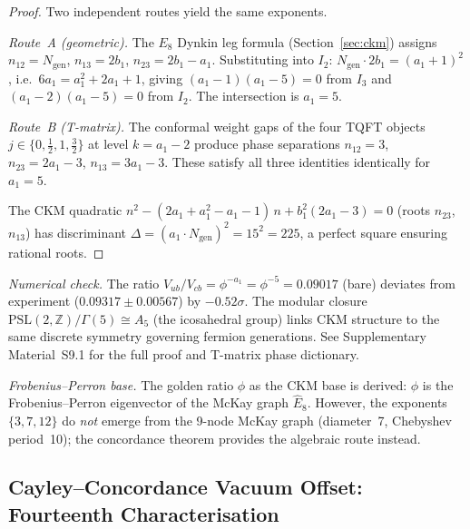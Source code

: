 \documentclass[12pt,a4paper]{article}
\theoremstyle{definition}
\begin{document}
\begin{proof}
Two independent routes yield the same exponents.

\emph{Route~A (geometric).}  The $E_8$ Dynkin leg formula (Section~\ref{sec:ckm}) assigns $n_{12} = N_{\text{gen}}$, $n_{13} = 2b_1$, $n_{23} = 2b_1 - a_1$.  Substituting into $I_2$: $N_{\text{gen}} \cdot 2b_1 = (a_1+1)^2$, i.e.\ $6a_1 = a_1^2 + 2a_1 + 1$, giving $(a_1 - 1)(a_1 - 5) = 0$ from $I_3$ and $(a_1 - 2)(a_1 - 5) = 0$ from $I_2$.  The intersection is $a_1 = 5$.

\emph{Route~B (T-matrix).}  The conformal weight gaps of the four TQFT objects $j \in \{0, \tfrac{1}{2}, 1, \tfrac{3}{2}\}$ at level $k = a_1 - 2$ produce phase separations $n_{12} = 3$, $n_{23} = 2a_1 - 3$, $n_{13} = 3a_1 - 3$.  These satisfy all three identities identically for $a_1 = 5$.

The CKM quadratic $n^2 - (2a_1 + a_1^2 - a_1 - 1)\,n + b_1^2(2a_1 - 3) = 0$ (roots $n_{23}$, $n_{13}$) has discriminant $\Delta = (a_1 \cdot N_{\text{gen}})^2 = 15^2 = 225$, a perfect square ensuring rational roots.
\end{proof}

\noindent\textit{Numerical check.}  The ratio $V_{ub}/V_{cb} = \phi^{-a_1} = \phi^{-5} = 0.09017$ (bare) deviates from experiment ($0.09317 \pm 0.00567$) by $-0.52\sigma$.  The modular closure $\text{PSL}(2,\mathbb{Z})/\Gamma(5) \cong A_5$ (the icosahedral group) links CKM structure to the same discrete symmetry governing fermion generations.  See Supplementary Material~S9.1 for the full proof and T-matrix phase dictionary.

\textit{Frobenius--Perron base.}  The golden ratio $\phi$ as the CKM base is derived: $\phi$ is the Frobenius--Perron eigenvector of the McKay graph $\hat{E}_8$.  However, the exponents $\{3,7,12\}$ do \emph{not} emerge from the 9-node McKay graph (diameter~7, Chebyshev period~10); the concordance theorem provides the algebraic route instead.

\subsection{Cayley--Concordance Vacuum Offset: Fourteenth Characterisation}
\label{sec:vacuum_offset}
\end{document}
